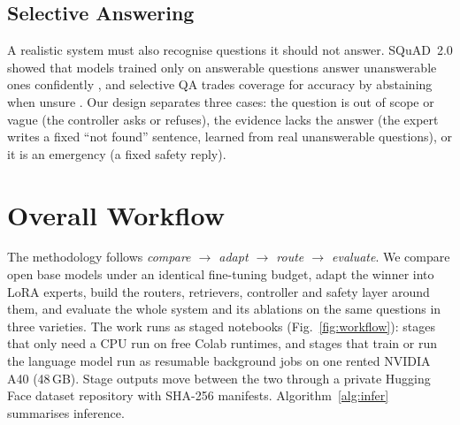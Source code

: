 \subsection{Selective Answering}
A realistic system must also recognise questions it should not answer. SQuAD~2.0 showed that models trained only on answerable questions answer unanswerable ones confidently \cite{rajpurkar2018squad2}, and selective QA trades coverage for accuracy by abstaining when unsure \cite{kamath2020selective}. Our design separates three cases: the question is out of scope or vague (the controller asks or refuses), the evidence lacks the answer (the expert writes a fixed ``not found'' sentence, learned from real unanswerable questions), or it is an emergency (a fixed safety reply).

\section{Overall Workflow}
\label{sec:overview}

The methodology follows \emph{compare $\rightarrow$ adapt $\rightarrow$ route $\rightarrow$ evaluate}. We compare open base models under an identical fine-tuning budget, adapt the winner into LoRA experts, build the routers, retrievers, controller and safety layer around them, and evaluate the whole system and its ablations on the same questions in three varieties. The work runs as staged notebooks (Fig.~\ref{fig:workflow}): stages that only need a CPU run on free Colab runtimes, and stages that train or run the language model run as resumable background jobs on one rented NVIDIA A40 (48\,GB). Stage outputs move between the two through a private Hugging Face dataset repository with SHA-256 manifests. Algorithm~\ref{alg:infer} summarises inference.

